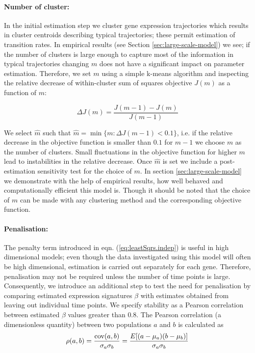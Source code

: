 \paragraph{Number of cluster:}
\label{sec:number-cluster}

In the initial estimation step we cluster gene expression trajectories which results in cluster centroids describing typical trajectories; these permit estimation of transition rates. In empirical results (see Section \ref{sec:large-scale-model}) we see; if the number of clusters is large enough to capture most of the information in typical trajectories changing $m$ does not have a significant impact on parameter estimation. Therefore, we set $m$ using a simple k-means algorithm and inspecting the relative decrease of within-cluster sum of squares objective $J(m)$ as a function of $m$:

\[
\Delta J(m) = \frac{J(m-1) - J(m)}{J(m - 1)}
\]

We select $\hat{m}$  such that $\hat{m} = \min \lbrace m : \Delta J(m-1) < 0.1 \rbrace$, i.e. if the relative decrease in the objective function is smaller than $0.1$ for $m-1$ we choose $m$ as the number of clusters. Small fluctuations in the objective function for higher $m$ lead to instabilities in the relative decrease. Once $\hat{m}$ is set we include a post-estimation sensitivity test for the choice of $m$. In section \ref{sec:large-scale-model} we demonstrate with the help of empirical results, how well behaved and computationally efficient this model is. Though it should be noted that the choice of $m$ can be made with any clustering method and the corresponding objective function.

\paragraph{Penalisation:}
\label{sec:penalization}

The penalty term introduced in eqn. (\ref{eq:leastSqrs.indep}) is useful in high dimensional models; even though the data investigated using this model will often be high dimensional, estimation is carried out separately for each gene. Therefore, penalisation may not be required unless the number of time points is large. Consequently, we introduce an additional step to test the need for penalisation by comparing estimated expression signatures $\beta$ with estimates obtained from leaving out individual time points. We specify stability as a Pearson correlation between estimated $\beta$ values  greater than $0.8$. The Pearson correlation (a dimensionless quantity) between two populations $a$ and $b$ is calculated as
\[
\rho(a,b)={\mathrm{cov}(a,b) \over \sigma_a \sigma_b} ={E[(a-\mu_a)(b-\mu_b)] \over \sigma_a\sigma_b}
\]

